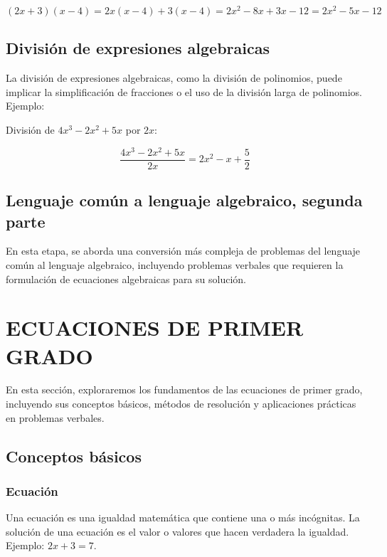 \[
(2x + 3)(x - 4) = 2x(x - 4) + 3(x - 4) = 2x^2 - 8x + 3x - 12 = 2x^2 - 5x - 12
\]

\subsection{División de expresiones algebraicas}

La división de expresiones algebraicas, como la división de polinomios, puede implicar la simplificación de fracciones o el uso de la división larga de polinomios. Ejemplo:

División de \(4x^3 - 2x^2 + 5x\) por \(2x\):

\[
\frac{4x^3 - 2x^2 + 5x}{2x} = 2x^2 - x + \frac{5}{2}
\]

\subsection{Lenguaje común a lenguaje algebraico, segunda parte}

En esta etapa, se aborda una conversión más compleja de problemas del lenguaje común al lenguaje algebraico, incluyendo problemas verbales que requieren la formulación de ecuaciones algebraicas para su solución.









\section{ECUACIONES DE PRIMER GRADO}%

En esta sección, exploraremos los fundamentos de las ecuaciones de primer grado, incluyendo sus conceptos básicos, métodos de resolución y aplicaciones prácticas en problemas verbales.

\subsection{Conceptos básicos}

\subsubsection{Ecuación}

Una ecuación es una igualdad matemática que contiene una o más incógnitas. La solución de una ecuación es el valor o valores que hacen verdadera la igualdad. Ejemplo: \(2x + 3 = 7\).

